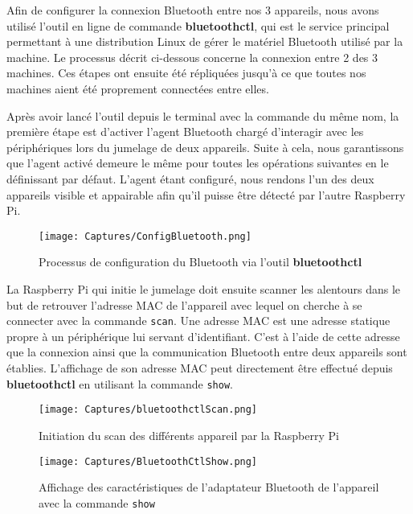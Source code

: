 \documentclass[a4paper,11pt]{article}
\begin{document}
\quad

Afin de configurer la connexion Bluetooth entre nos 3 appareils, nous avons utilisé l'outil en ligne de commande \textbf{bluetoothctl}, qui est le service principal permettant à une distribution Linux de gérer le matériel Bluetooth utilisé par la machine. Le processus décrit ci-dessous concerne la connexion entre 2 des 3 machines. Ces étapes ont ensuite été répliquées jusqu'à ce que toutes nos machines aient été proprement connectées entre elles.

\quad

Après avoir lancé l'outil depuis le terminal avec la commande du même nom, la première étape est d'activer l'agent Bluetooth chargé d’interagir avec les périphériques lors du jumelage de deux appareils. Suite à cela, nous garantissons que l'agent activé demeure le même pour toutes les opérations suivantes en le définissant par défaut. L'agent étant configuré, nous rendons l'un des deux appareils visible et appairable afin qu'il puisse être détecté par l'autre Raspberry Pi.

\begin{figure}[H]
    \centering
    \texttt{[image: Captures/ConfigBluetooth.png]}
    \caption{Processus de configuration du Bluetooth via l'outil \textbf{bluetoothctl}}
    \label{fig:enter-label}
\end{figure}

La Raspberry Pi qui initie le jumelage doit ensuite scanner les alentours dans le but de retrouver l'adresse MAC de l'appareil avec lequel on cherche à se connecter avec la commande \texttt{scan}. Une adresse MAC est une adresse statique propre à un périphérique lui servant d'identifiant. C'est à l'aide de cette adresse que la connexion ainsi que la communication Bluetooth entre deux appareils sont établies. L'affichage de son adresse MAC peut directement être effectué depuis \textbf{bluetoothctl} en utilisant la commande \texttt{show}.

\begin{figure}[H]
    \centering
    \texttt{[image: Captures/bluetoothctlScan.png]}
    \caption{Initiation du scan des différents appareil par la Raspberry Pi}
    \label{fig:enter-label}
\end{figure}

\begin{figure}[H]
    \centering
    \texttt{[image: Captures/BluetoothCtlShow.png]}
    \caption{Affichage des caractéristiques de l'adaptateur Bluetooth de l'appareil avec la commande \texttt{show}}
    \label{fig:enter-label}
\end{figure}
\end{document}
